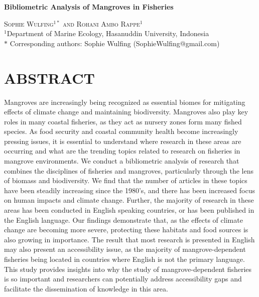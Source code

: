 \documentclass[
  12pt,
]{article}
\author{}
\date{\vspace{-2.5em}}
\begin{document}
\doublespacing

\begin{center}
    
\textbf{\Large Bibliometric Analysis of Mangroves in Fisheries}
    
\textsc{Sophie Wulfing$^{1*}$ and Rohani Ambo Rappe$^{1}$\\}
\vspace{3 mm}
\normalsize{\indent $^1$Department of Marine Ecology, Hasanuddin University, Indonesia\\}
$\text{*}$ Corresponding authors: Sophie Wulfing (SophieWulfing@gmail.com)
\end{center}

\newpage

\hypertarget{abstract}{%
\section{ABSTRACT}\label{abstract}}

Mangroves are increasingly being recognized as essential biomes for mitigating effects of climate change and maintaining biodiversity. Mangroves also play key roles in many coastal fisheries, as they act as nursery zones form many fished species. As food security and coastal community health become increasingly pressing issues, it is essential to understand where research in these areas are occurring and what are the trending topics related to research on fisheries in mangrove environments. We conduct a bibliometric analysis of research that combines the disciplines of fisheries and mangroves, particularly through the lens of biomass and biodiversity. We find that the number of articles in these topics have been steadily increasing since the 1980's, and there has been increased focus on human impacts and climate change. Further, the majority of research in these areas has been conducted in English speaking countries, or has been published in the English language. Our findings demonstrate that, as the effects of climate change are becoming more severe, protecting these habitats and food sources is also growing in importance. The result that most research is presented in English may also present an accessibility issue, as the majority of mangrove-dependent fisheries being located in countries where English is not the primary language. This study provides insights into why the study of mangrove-dependent fisheries is so important and researchers can potentially address accessibility gaps and facilitate the dissemination of knowledge in this area.
\end{document}

